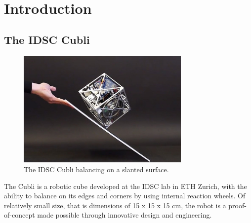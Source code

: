 \chapter{Introduction}\label{sec:introduction}

\section{The IDSC Cubli}\label{sec:cubli}

\begin{figure}[ht]
   \centering
   \includegraphics[width=0.75\textwidth]{img/Cubli.jpg}
   \caption{The IDSC Cubli balancing on a slanted surface.}
   \label{img:Cubli}
\end{figure}

The Cubli is a robotic cube developed at the IDSC lab in ETH Zurich, with the ability to balance on its edges and corners by using internal reaction wheels. Of relatively small size, that is dimensions of 15 x 15 x 15 cm, the robot is a proof-of-concept made possible through innovative design and engineering.

